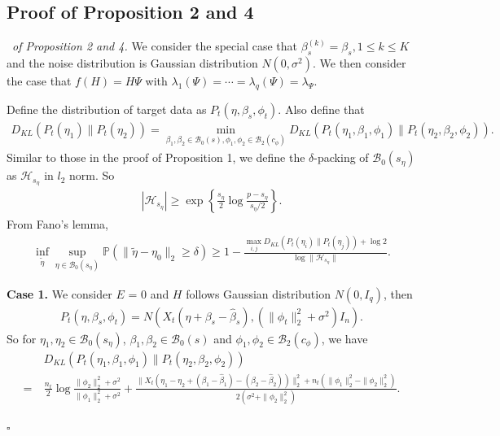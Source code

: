 \documentclass[12pt]{article}
\newenvironment{pf}{{\noindent \it Proof}\ }{\hfill $\square$\par}
\begin{document}
\subsection{Proof of Proposition 2 and 4}
\begin{pf}{\it of Proposition 2 and 4. }
    We consider the special case that $\beta_s^{(k)} = \beta_s, 1\le k \le K$ and the noise distribution is Gaussian distribution $N(0,\sigma^2)$. We then consider the case that $f(H) = H\Psi$ with $\lambda_1(\Psi) = \cdots = \lambda_q(\Psi) = \lambda_\Psi$. 
    
    Define the distribution of target data as $P_t(\eta,\beta_s,\phi_t)$. Also define that 
    \begin{align*}
        D_{KL}(P_t(\eta_1)\|P_t(\eta_2)) = \min_{\beta_1,\beta_2\in \mathcal{B}_0(s),\phi_1,\phi_2 \in\mathcal{B}_2(c_\phi)} D_{KL}(P_t(\eta_1,\beta_1,\phi_1)\|P_t(\eta_2,\beta_2,\phi_2)). 
    \end{align*}
    Similar to those in the proof of Proposition 1, we define the $\delta$-packing of $\mathcal{B}_0(s_\eta)$ as $\mathcal{H}_{s_\eta}$ in $l_2$ norm. So 
    \begin{align*}
        \left|\mathcal{H}_{s_\eta}\right|\ge\exp\left\{\frac{s_\eta}{2}\log \frac{p-s_\eta}{s_\eta/2}\right\}.
    \end{align*}
    From Fano's lemma,
    \begin{align*}
        \inf_{\tilde{\eta}}\sup
        _{\eta\in \mathcal{B}_0(s_\eta)}\mathbb{P}(\|\tilde{\eta}-\eta_0\|_2 \ge \delta) \ge 1- \frac{\max_{i,j}D_{KL}(P_t(\eta_i)\|P_t(\eta_j)) +\log 2}{\log\|\mathcal{H}_{s_\eta}\|}. 
    \end{align*}

    \textbf{Case 1. }
    We consider $E$ = 0 and $H$ follows Gaussian distribution $N(0,I_q)$, then
    \begin{align*}
        P_t(\eta,\beta_s,\phi_t) = N\left(X_t\left(\eta +\beta_s - \hat{\beta}_s\right), \left(\|\phi_t\|_2^2 + \sigma^2\right) I_n\right). 
    \end{align*}
    So for $\eta_1,\eta_2\in \mathcal{B}_0(s_\eta)$, $\beta_1,\beta_2\in \mathcal{B}_0(s)$ and $\phi_1,\phi_2 \in \mathcal{B}_2(c_\phi)$, we have 
    \begin{align*}
        & D_{KL}(P_t(\eta_1,\beta_1,\phi_1)\|P_t(\eta_2,\beta_2,\phi_2))\\ =\ & \frac{n_t}{2} \log \frac{\|\phi_2\|_2^2 +\sigma^2}{\|\phi_1\|_2^2 + \sigma^2} + \frac{\|X_t(\eta_1-\eta_2 + (\beta_1 -\hat{\beta}_1) - (\beta_2 -\hat{\beta}_2))\|_2^2 + n_t(\|\phi_1\|_2^2 - \|\phi_2\|_2^2)}{2(\sigma^2 + \|\phi_2\|_2^2)}. 
    \end{align*}
   

\end{pf}
\end{document}
